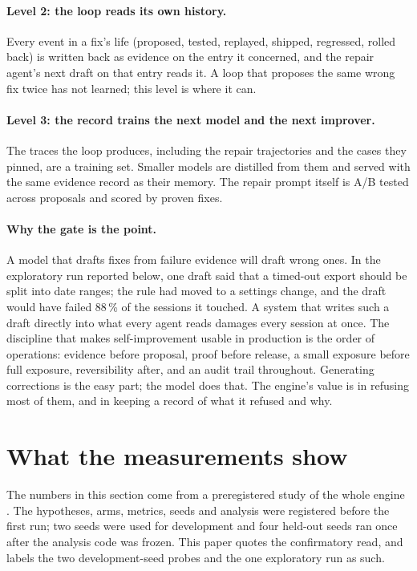 \documentclass[11pt]{article}
\begin{document}
\paragraph{Level 2: the loop reads its own history.} Every event in a fix's life (proposed,
tested, replayed, shipped, regressed, rolled back) is written back as evidence on the entry it
concerned, and the repair agent's next draft on that entry reads it. A loop that proposes the
same wrong fix twice has not learned; this level is where it can.

\paragraph{Level 3: the record trains the next model and the next improver.} The traces the
loop produces, including the repair trajectories and the cases they pinned, are a training set.
Smaller models are distilled from them and served with the same evidence record as their memory.
The repair prompt itself is A/B tested across proposals and scored by proven fixes.

\paragraph{Why the gate is the point.} A model that drafts fixes from failure evidence will draft
wrong ones. In the exploratory run reported below, one draft said that a timed-out export should
be split into date ranges; the rule had moved to a settings change, and the draft would have
failed 88\,\% of the sessions it touched. A system that writes such a draft directly into what
every agent reads damages every session at once. The discipline that makes self-improvement
usable in production is the order of operations: evidence before proposal, proof before release,
a small exposure before full exposure, reversibility after, and an audit trail throughout.
Generating corrections is the easy part; the model does that. The engine's value is in refusing
most of them, and in keeping a record of what it refused and why.

\section{What the measurements show}
\label{sec:evidence}

The numbers in this section come from a preregistered study of the whole engine
\cite{rsi-paper}. The hypotheses, arms, metrics, seeds and analysis were registered before the
first run; two seeds were used for development and four held-out seeds ran once after the
analysis code was frozen. This paper quotes the confirmatory read, and labels the two
development-seed probes and the one exploratory run as such.
\end{document}
